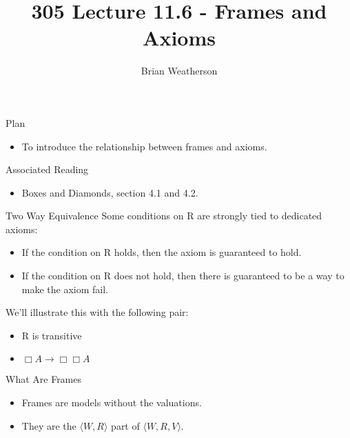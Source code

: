 \documentclass[
  ignorenonframetext,
]{beamer}
\title{305 Lecture 11.6 - Frames and Axioms}
\author{Brian Weatherson}
\date{}
\providecommand{\tightlist}{%
  \setlength{\itemsep}{0pt}\setlength{\parskip}{0pt}}
\renewcommand{\,}{\text{, }}
\begin{document}
\frame{\titlepage}

\begin{frame}{Plan}
\protect\hypertarget{plan}{}
\begin{itemize}
\tightlist
\item
  To introduce the relationship between frames and axioms.
\end{itemize}
\end{frame}

\begin{frame}{Associated Reading}
\protect\hypertarget{associated-reading}{}
\begin{itemize}
\tightlist
\item
  Boxes and Diamonds, section 4.1 and 4.2.
\end{itemize}
\end{frame}

\begin{frame}{Two Way Equivalence}
\protect\hypertarget{two-way-equivalence}{}
Some conditions on R are strongly tied to dedicated axioms:

\begin{itemize}
\tightlist
\item
  If the condition on R holds, then the axiom is guaranteed to hold.
\item
  If the condition on R does not hold, then there is guaranteed to be a
  way to make the axiom fail.
\end{itemize}

We'll illustrate this with the following pair:

\begin{itemize}
\tightlist
\item
  R is transitive
\item
  \(\Box A \rightarrow \Box \Box A\)
\end{itemize}
\end{frame}

\begin{frame}{What Are Frames}
\protect\hypertarget{what-are-frames}{}
\begin{itemize}
\tightlist
\item
  Frames are models without the valuations.
\item
  They are the \(\langle W, R \rangle\) part of
  \(\langle W, R, V \rangle\).
\end{itemize}
\end{frame}
\end{document}
